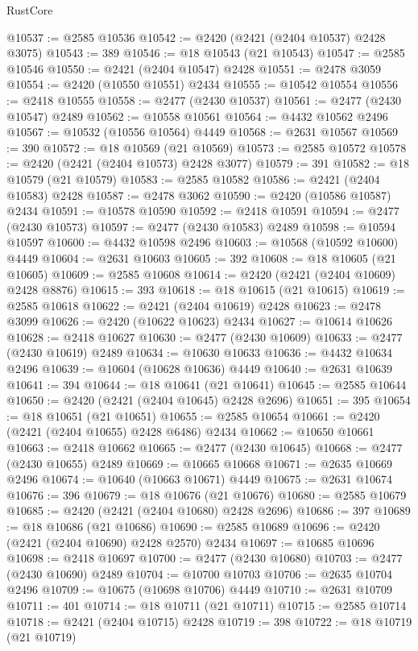 \begin{lexlean}{RustCore}
\begin{coremodule}
@10537 := @2585 @10536
@10542 := @2420 (@2421 (@2404 @10537) @2428 @3075)
@10543 := 389
@10546 := @18 @10543 (@21 @10543)
@10547 := @2585 @10546
@10550 := @2421 (@2404 @10547) @2428
@10551 := @2478 @3059
@10554 := @2420 (@10550 @10551) @2434
@10555 := @10542 @10554
@10556 := @2418 @10555
@10558 := @2477 (@2430 @10537)
@10561 := @2477 (@2430 @10547) @2489
@10562 := @10558 @10561
@10564 := @4432 @10562 @2496
@10567 := @10532 (@10556 @10564) @4449
@10568 := @2631 @10567
@10569 := 390
@10572 := @18 @10569 (@21 @10569)
@10573 := @2585 @10572
@10578 := @2420 (@2421 (@2404 @10573) @2428 @3077)
@10579 := 391
@10582 := @18 @10579 (@21 @10579)
@10583 := @2585 @10582
@10586 := @2421 (@2404 @10583) @2428
@10587 := @2478 @3062
@10590 := @2420 (@10586 @10587) @2434
@10591 := @10578 @10590
@10592 := @2418 @10591
@10594 := @2477 (@2430 @10573)
@10597 := @2477 (@2430 @10583) @2489
@10598 := @10594 @10597
@10600 := @4432 @10598 @2496
@10603 := @10568 (@10592 @10600) @4449
@10604 := @2631 @10603
@10605 := 392
@10608 := @18 @10605 (@21 @10605)
@10609 := @2585 @10608
@10614 := @2420 (@2421 (@2404 @10609) @2428 @8876)
@10615 := 393
@10618 := @18 @10615 (@21 @10615)
@10619 := @2585 @10618
@10622 := @2421 (@2404 @10619) @2428
@10623 := @2478 @3099
@10626 := @2420 (@10622 @10623) @2434
@10627 := @10614 @10626
@10628 := @2418 @10627
@10630 := @2477 (@2430 @10609)
@10633 := @2477 (@2430 @10619) @2489
@10634 := @10630 @10633
@10636 := @4432 @10634 @2496
@10639 := @10604 (@10628 @10636) @4449
@10640 := @2631 @10639
@10641 := 394
@10644 := @18 @10641 (@21 @10641)
@10645 := @2585 @10644
@10650 := @2420 (@2421 (@2404 @10645) @2428 @2696)
@10651 := 395
@10654 := @18 @10651 (@21 @10651)
@10655 := @2585 @10654
@10661 := @2420 (@2421 (@2404 @10655) @2428 @6486) @2434
@10662 := @10650 @10661
@10663 := @2418 @10662
@10665 := @2477 (@2430 @10645)
@10668 := @2477 (@2430 @10655) @2489
@10669 := @10665 @10668
@10671 := @2635 @10669 @2496
@10674 := @10640 (@10663 @10671) @4449
@10675 := @2631 @10674
@10676 := 396
@10679 := @18 @10676 (@21 @10676)
@10680 := @2585 @10679
@10685 := @2420 (@2421 (@2404 @10680) @2428 @2696)
@10686 := 397
@10689 := @18 @10686 (@21 @10686)
@10690 := @2585 @10689
@10696 := @2420 (@2421 (@2404 @10690) @2428 @2570) @2434
@10697 := @10685 @10696
@10698 := @2418 @10697
@10700 := @2477 (@2430 @10680)
@10703 := @2477 (@2430 @10690) @2489
@10704 := @10700 @10703
@10706 := @2635 @10704 @2496
@10709 := @10675 (@10698 @10706) @4449
@10710 := @2631 @10709
@10711 := 401
@10714 := @18 @10711 (@21 @10711)
@10715 := @2585 @10714
@10718 := @2421 (@2404 @10715) @2428
@10719 := 398
@10722 := @18 @10719 (@21 @10719)

\end{coremodule}
\end{lexlean}
